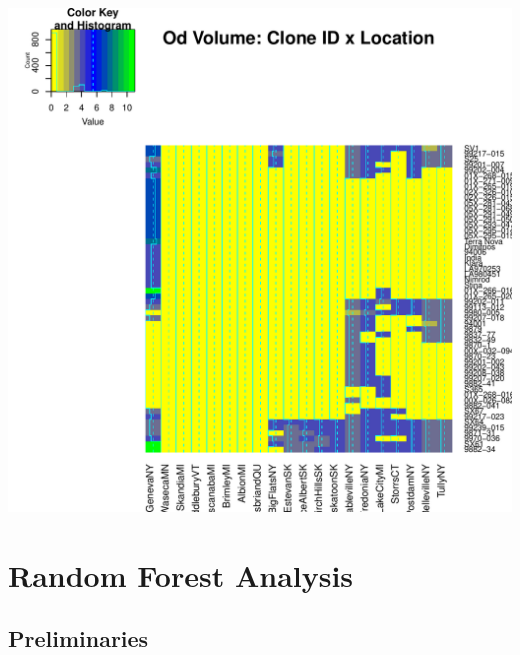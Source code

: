 \documentclass{article}\usepackage[]{graphicx}\usepackage[]{color}
\makeatletter
\def\maxwidth{ %
  \ifdim\Gin@nat@width>\linewidth
    \linewidth
  \else
    \Gin@nat@width
  \fi
}
\newenvironment{knitrout}{}{} %
\makeatother
\begin{document}
\begin{knitrout}
{}




{\centering \includegraphics[width=\maxwidth]{figure/HeatmapSurvivalYield-5} 

}



\end{knitrout}


\section*{Random Forest Analysis}

\subsection*{Preliminaries}
\end{document}
